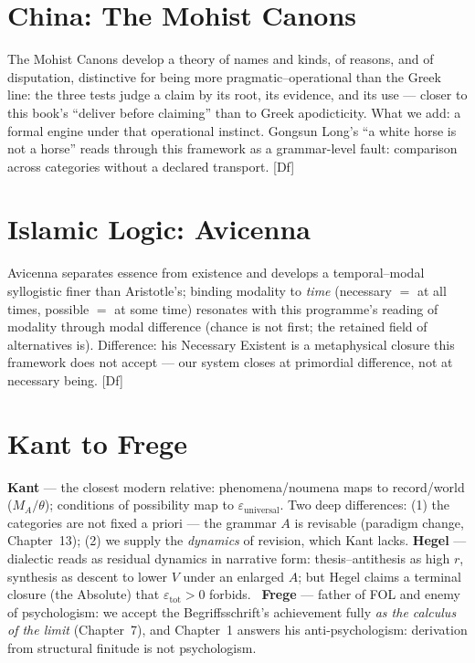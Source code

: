 \documentclass[11pt,a4paper,twoside]{book}
\newcommand{\tier}[1]{\textnormal{\small\textsf{[#1]}}}
\newcommand{\Df}{\tier{Df}}\newcommand{\OpenT}{\tier{Open}}
\theoremstyle{plain}
\theoremstyle{definition}
\theoremstyle{remark}
\begin{document}
\chapter{China: The Mohist Canons}

The Mohist Canons develop a theory of names and kinds, of reasons, and of
disputation, distinctive for being more pragmatic--operational than the Greek
line: the three tests judge a claim by its root, its evidence, and its use
--- closer to this book's ``deliver before claiming'' than to Greek
apodicticity. What we add: a formal engine under that operational instinct.
Gongsun Long's ``a white horse is not a horse'' reads through this framework
as a grammar-level fault: comparison across categories without a declared
transport. \Df

\chapter{Islamic Logic: Avicenna}

Avicenna separates essence from existence and develops a temporal--modal
syllogistic finer than Aristotle's; binding modality to \emph{time}
(necessary $=$ at all times, possible $=$ at some time) resonates with this
programme's reading of modality through modal difference (chance is not
first; the retained field of alternatives is). Difference: his Necessary
Existent is a metaphysical closure this framework does not accept --- our
system closes at primordial difference, not at necessary being. \Df

\chapter{Kant to Frege}

\textbf{Kant} --- the closest modern relative: phenomena/noumena maps to
record/world ($M_A/\theta$); conditions of possibility map to
$\varepsilon_{\mathrm{universal}}$. Two deep differences: (1) the categories
are not fixed a priori --- the grammar $A$ is revisable (paradigm change,
Chapter~13); (2) we supply the \emph{dynamics} of revision, which Kant lacks.
\textbf{Hegel} --- dialectic reads as residual dynamics in narrative form:
thesis--antithesis as high $r$, synthesis as descent to lower $V$ under an
enlarged $A$; but Hegel claims a terminal closure (the Absolute) that
$\varepsilon_{\mathrm{tot}}>0$ forbids. \Cj\ \textbf{Frege} --- father of
FOL and enemy of psychologism: we accept the Begriffsschrift's achievement
fully \emph{as the calculus of the limit} (Chapter~7), and Chapter~1 answers
his anti-psychologism: derivation from structural finitude is not
psychologism.
\end{document}
